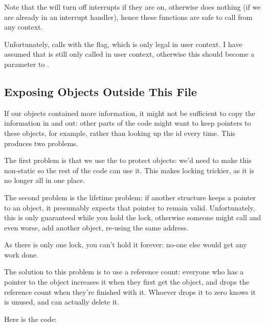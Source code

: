 \documentclass[a4paper,8pt,english]{sphinxmanual}
\begin{document}
Note that the  will turn off
interrupts if they are on, otherwise does nothing (if we are already in
an interrupt handler), hence these functions are safe to call from any
context.

Unfortunately,  calls 
with the  flag, which is only legal in user context. I
have assumed that  is still only called in
user context, otherwise this should become a parameter to
.


\subsection{Exposing Objects Outside This File}
\label{kernel-hacking/locking:exposing-objects-outside-this-file}
If our objects contained more information, it might not be sufficient to
copy the information in and out: other parts of the code might want to
keep pointers to these objects, for example, rather than looking up the
id every time. This produces two problems.

The first problem is that we use the  to protect objects:
we'd need to make this non-static so the rest of the code can use it.
This makes locking trickier, as it is no longer all in one place.

The second problem is the lifetime problem: if another structure keeps a
pointer to an object, it presumably expects that pointer to remain
valid. Unfortunately, this is only guaranteed while you hold the lock,
otherwise someone might call  and even
worse, add another object, re-using the same address.

As there is only one lock, you can't hold it forever: no-one else would
get any work done.

The solution to this problem is to use a reference count: everyone who
has a pointer to the object increases it when they first get the object,
and drops the reference count when they're finished with it. Whoever
drops it to zero knows it is unused, and can actually delete it.

Here is the code:
\end{document}
